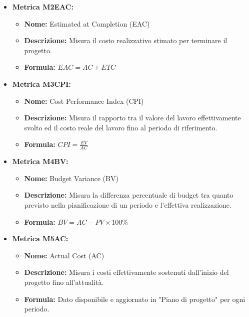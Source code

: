 \begin{itemize}
    \item \textbf{Metrica M2EAC:}
          \begin{itemize}
              \item \textbf{Nome:} Estimated at Completion (EAC)
              \item \textbf{Descrizione:} Misura il costo realizzativo stimato per terminare il progetto.
              \item \textbf{Formula:} $EAC = AC + ETC$
          \end{itemize}

    \item \textbf{Metrica M3CPI:}
          \begin{itemize}
              \item \textbf{Nome:} Cost Performance Index (CPI)
              \item \textbf{Descrizione:} Misura il rapporto tra il valore del lavoro effettivamente svolto ed il costo reale del lavoro fino al periodo di riferimento.
              \item \textbf{Formula:} $CPI = \frac{EV}{AC}$
          \end{itemize}

    \item \textbf{Metrica M4BV:}
          \begin{itemize}
              \item \textbf{Nome:} Budget Variance (BV)
              \item \textbf{Descrizione:} Misura la differenza percentuale di budget tra quanto previsto nella pianificazione di un periodo e l’effettiva realizzazione.
              \item \textbf{Formula:} $BV = AC - PV \times 100\% $
          \end{itemize}

    \item \textbf{Metrica M5AC:}
          \begin{itemize}
              \item \textbf{Nome:} Actual Cost (AC)
              \item \textbf{Descrizione:} Misura i costi effettivamente sostenuti dall’inizio del progetto fino all’attualità.
              \item \textbf{Formula:} Dato disponibile e aggiornato in "Piano di progetto" per ogni periodo.
          \end{itemize}


\end{itemize}
